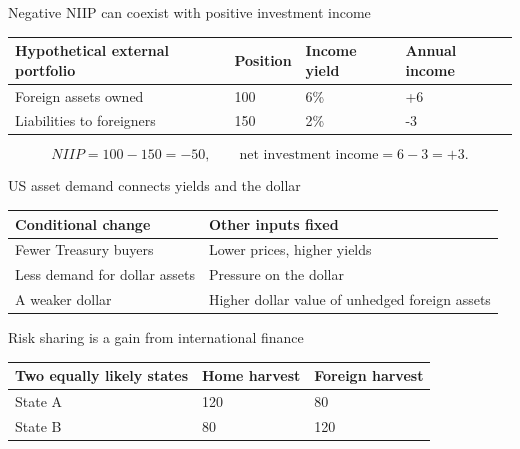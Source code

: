 \documentclass[12pt,aspectratio=169]{beamer}
\begin{document}
\begin{frame}{Negative NIIP can coexist with positive investment income}
\begin{center}\begin{tabular}{@{}llll@{}}\toprule \textbf{Hypothetical external portfolio} & \textbf{Position} & \textbf{Income yield} & \textbf{Annual income}\\\midrule Foreign assets owned & 100 & 6\% & +6\\[2mm]
Liabilities to foreigners & 150 & 2\% & -3\\\bottomrule\end{tabular}\end{center}\[NIIP=100-150=-50,\qquad\text{net investment income}=6-3=+3.\]
\end{frame}


\begin{frame}{US asset demand connects yields and the dollar}
\begin{center}\begin{tabular}{@{}p{}p{}@{}}\toprule \textbf{Conditional change} & \textbf{Other inputs fixed}\\\midrule Fewer Treasury buyers & Lower prices, higher yields\\[2mm]
Less demand for dollar assets & Pressure on the dollar\\[2mm]
A weaker dollar & Higher dollar value of unhedged foreign assets\\\bottomrule\end{tabular}\end{center}
\end{frame}


\begin{frame}{Risk sharing is a gain from international finance}
\begin{center}\begin{tabular}{@{}lll@{}}\toprule \textbf{Two equally likely states} & \textbf{Home harvest} & \textbf{Foreign harvest}\\\midrule State A & 120 & 80\\[2mm]
State B & 80 & 120\\\bottomrule\end{tabular}\end{center}
\end{frame}
\end{document}
